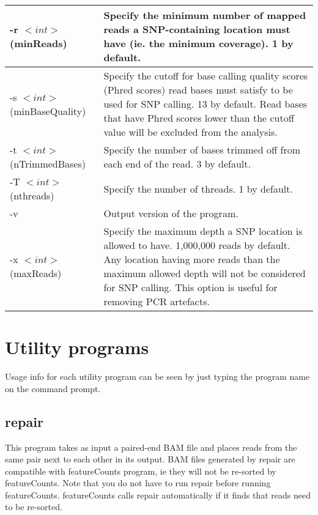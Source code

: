 \documentclass[12pt]{report}
\newcommand{\featureCounts}{\textsf{featureCounts}}
\newcommand{\repair}{\textsf{repair}}
\begin{document}
\begin{longtable}{|p{4.5cm}|p{11cm}|}
\hline
-r $<int>$ \newline (minReads) & Specify the minimum number of mapped reads a SNP-containing location must have (ie. the minimum coverage). 1 by default. \\
\hline
-s $<int>$ \newline (minBaseQuality) & Specify the cutoff for base calling quality scores (Phred scores) read bases must satisfy to be used for SNP calling. 13 by default. Read bases that have Phred scores lower than the cutoff value will be excluded from the analysis. \\
\hline
-t $<int>$ \newline (nTrimmedBases) & Specify the number of bases trimmed off from each end of the read. 3 by default. \\
\hline
-T $<int>$ \newline (nthreads) & Specify the number of threads. 1 by default. \\
\hline
-v & Output version of the program. \\
\hline
-x $<int>$ \newline (maxReads) & Specify the maximum depth a SNP location is allowed to have. 1,000,000 reads by default. Any location having more reads than the maximum allowed depth will not be considered for SNP calling. This option is useful for removing PCR artefacts. \\
\hline
\end{longtable}



\chapter{Utility programs}

Usage info for each utility program can be seen by just typing the program name on the command prompt.

\section{repair}

This program takes as input a paired-end BAM file and places reads from the same pair next to each other in its output.
BAM files generated by {\repair} are compatible with {\featureCounts} program, ie they will not be re-sorted by {\featureCounts}.
Note that you do not have to run {\repair} before running {\featureCounts}.
{\featureCounts} calls {\repair} automatically if it finds that reads need to be re-sorted.
\end{document}
